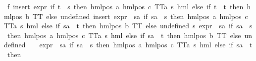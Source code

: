 \begin{isabellebody}
\ f{}{\isacharcolon}{\kern0pt}\ {\isachardoublequoteopen}insert\ {\isacharparenleft}{\kern0pt}expr{\isacharunderscore}{\kern0pt}{}\ {\isacharparenleft}{\kern0pt}if\ t\ {\isacharequal}{\kern0pt}\ s\ then\ hml{\isacharunderscore}{\kern0pt}pos\ a\ {\isacharparenleft}{\kern0pt}hml{\isacharunderscore}{\kern0pt}pos\ c\ {\isacharparenleft}{\kern0pt}TT{\isacharcolon}{\kern0pt}{\isacharcolon}{\kern0pt}{\isacharparenleft}{\kern0pt}{\isacharprime}{\kern0pt}a{\isacharcomma}{\kern0pt}\ {\isacharprime}{\kern0pt}s{\isacharparenright}{\kern0pt}\ hml{\isacharparenright}{\kern0pt}{\isacharparenright}{\kern0pt}\ else\ if\ t\ {\isacharequal}{\kern0pt}\ t\ then\ hml{\isacharunderscore}{\kern0pt}pos\ b\ TT\ else\ undefined{\isacharparenright}{\kern0pt}{\isacharparenright}{\kern0pt}\ {\isacharparenleft}{\kern0pt}insert\ {\isacharparenleft}{\kern0pt}{\isacharparenleft}{\kern0pt}expr{\isacharunderscore}{\kern0pt}{}\ {\isasymcirc}\ {\isacharparenleft}{\kern0pt}{\isasymlambda}sa{\isachardot}{\kern0pt}\ if\ sa\ {\isacharequal}{\kern0pt}\ s\ then\ hml{\isacharunderscore}{\kern0pt}pos\ a\ {\isacharparenleft}{\kern0pt}hml{\isacharunderscore}{\kern0pt}pos\ c\ {\isacharparenleft}{\kern0pt}TT{\isacharcolon}{\kern0pt}{\isacharcolon}{\kern0pt}{\isacharparenleft}{\kern0pt}{\isacharprime}{\kern0pt}a{\isacharcomma}{\kern0pt}\ {\isacharprime}{\kern0pt}s{\isacharparenright}{\kern0pt}\ hml{\isacharparenright}{\kern0pt}{\isacharparenright}{\kern0pt}\ else\ if\ sa\ {\isacharequal}{\kern0pt}\ t\ then\ hml{\isacharunderscore}{\kern0pt}pos\ b\ TT\ else\ undefined{\isacharparenright}{\kern0pt}{\isacharparenright}{\kern0pt}\ s{\isacharparenright}{\kern0pt}\ {\isacharparenleft}{\kern0pt}{\isacharparenleft}{\kern0pt}expr{\isacharunderscore}{\kern0pt}{}\ {\isasymcirc}\ {\isacharparenleft}{\kern0pt}{\isasymlambda}sa{\isachardot}{\kern0pt}\ if\ sa\ {\isacharequal}{\kern0pt}\ s\ then\ hml{\isacharunderscore}{\kern0pt}pos\ a\ {\isacharparenleft}{\kern0pt}hml{\isacharunderscore}{\kern0pt}pos\ c\ {\isacharparenleft}{\kern0pt}TT{\isacharcolon}{\kern0pt}{\isacharcolon}{\kern0pt}{\isacharparenleft}{\kern0pt}{\isacharprime}{\kern0pt}a{\isacharcomma}{\kern0pt}\ {\isacharprime}{\kern0pt}s{\isacharparenright}{\kern0pt}\ hml{\isacharparenright}{\kern0pt}{\isacharparenright}{\kern0pt}\ else\ if\ sa\ {\isacharequal}{\kern0pt}\ t\ then\ hml{\isacharunderscore}{\kern0pt}pos\ b\ TT\ else\ undefined{\isacharparenright}{\kern0pt}{\isacharparenright}{\kern0pt}\ {\isacharbackquote}{\kern0pt}\ {\isacharbraceleft}{\kern0pt}{\isacharbraceright}{\kern0pt}{\isacharparenright}{\kern0pt}{\isacharparenright}{\kern0pt}\ {\isacharequal}{\kern0pt}\ {\isacharparenleft}{\kern0pt}expr{\isacharunderscore}{\kern0pt}{}\ {\isasymcirc}\ {\isacharparenleft}{\kern0pt}{\isasymlambda}sa{\isachardot}{\kern0pt}\ if\ sa\ {\isacharequal}{\kern0pt}\ s\ then\ hml{\isacharunderscore}{\kern0pt}pos\ a\ {\isacharparenleft}{\kern0pt}hml{\isacharunderscore}{\kern0pt}pos\ c\ {\isacharparenleft}{\kern0pt}TT{\isacharcolon}{\kern0pt}{\isacharcolon}{\kern0pt}{\isacharparenleft}{\kern0pt}{\isacharprime}{\kern0pt}a{\isacharcomma}{\kern0pt}\ {\isacharprime}{\kern0pt}s{\isacharparenright}{\kern0pt}\ hml{\isacharparenright}{\kern0pt}{\isacharparenright}{\kern0pt}\ else\ if\ sa\ {\isacharequal}{\kern0pt}\ t\ then\ 
\end{isabellebody}
